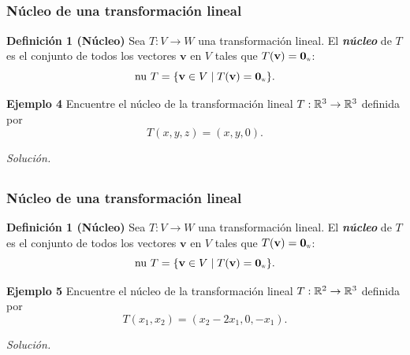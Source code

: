 
\subsection{}

\begin{frame}\frametitle{Núcleo de una transformación lineal}

\begin{block}{\textbf{Definición 1 (Núcleo)}}
	\justifying
	Sea $T:V\to W$ una transformación lineal. El \textbf{\textit{núcleo}} de $T$ es el conjunto de 
	todos los vectores $\mathbf{v}$ en $V$ tales que $T(\mathbf{v}) = \mathbf{0}_{\scalebox{0.4}{W}}$:
	\[
	\text{nu}\ T = \{ \mathbf{v}\in V \mid T(\mathbf{v}) = \mathbf{0}_{\scalebox{0.4}{W}} \}.
	\]
\end{block}


\begin{ej}{\textbf{Ejemplo 4}}
	\justifying
	Encuentre el núcleo de la transformación lineal $T:\mathbb{R}^3\to \mathbb{R}^3$ definida por
	\[
		T(x,y,z) = (x,y,0).
	\]
\end{ej}
\textit{Solución.}

\end{frame}


\subsection{}

\begin{frame}\frametitle{Núcleo de una transformación lineal}
	
	\begin{block}{\textbf{Definición 1 (Núcleo)}}
		\justifying
		Sea $T:V\to W$ una transformación lineal. El \textbf{\textit{núcleo}} de $T$ es el conjunto de 
		todos los vectores $\mathbf{v}$ en $V$ tales que $T(\mathbf{v}) = \mathbf{0}_{\scalebox{0.4}{W}}$:
		\[
		\text{nu}\ T = \{ \mathbf{v}\in V \mid T(\mathbf{v}) = \mathbf{0}_{\scalebox{0.4}{W}} \}.
		\]
	\end{block}
	
	\begin{ej}{\textbf{Ejemplo 5}}
		\justifying
		Encuentre el núcleo de la transformación lineal $T:\mathbb{R}^2\to \mathbb{R}^3$ definida por
		\[
		T(x_1,x_2) = (x_2-2x_1,0,-x_1).
		\]
	\end{ej}
	\textit{Solución.}
	
\end{frame}

